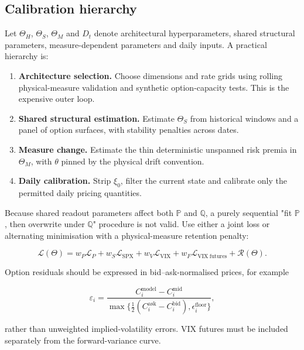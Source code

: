 \documentclass[11pt,a4paper]{article}
\newcommand{\Pp}{\mathbb{P}}
\newcommand{\Qq}{\mathbb{Q}}
\begin{document}
\subsection{Calibration hierarchy}

Let \(\Theta_H\), \(\Theta_S\), \(\Theta_M\) and \(D_t\) denote architectural
hyperparameters, shared structural parameters, measure-dependent parameters and daily inputs.
A practical hierarchy is:

\begin{enumerate}
  \item \textbf{Architecture selection.} Choose dimensions and rate grids using rolling
  physical-measure validation and synthetic option-capacity tests. This is the expensive outer
  loop.
  \item \textbf{Shared structural estimation.} Estimate \(\Theta_S\) from historical windows
  and a panel of option surfaces, with stability penalties across dates.
  \item \textbf{Measure change.} Estimate the thin deterministic unspanned risk premia in
  \(\Theta_M\), with \(\theta\) pinned by the physical drift convention.
  \item \textbf{Daily calibration.} Strip \(\xi_0\), filter the current state and calibrate only
  the permitted daily pricing quantities.
\end{enumerate}

Because shared readout parameters affect both \(\Pp\) and \(\Qq\), a purely sequential
"fit \(\Pp\), then overwrite under \(\Qq\)" procedure is not valid. Use either a joint loss
or alternating minimisation with a physical-measure retention penalty:

\begin{equation}
\mathcal L(\Theta)
=w_P\mathcal L_P
+w_S\mathcal L_{\mathrm{SPX}}
+w_V\mathcal L_{\mathrm{VIX}}
+w_F\mathcal L_{\mathrm{VIX\ futures}}
+\mathcal R(\Theta).
\label{eq:joint-loss}
\end{equation}

Option residuals should be expressed in bid--ask-normalised prices, for example

\begin{equation}
\varepsilon_i
=\frac{C_i^{\mathrm{model}}-C_i^{\mathrm{mid}}}
{\max\{\tfrac12(C_i^{\mathrm{ask}}-C_i^{\mathrm{bid}}),\epsilon_i^{\mathrm{floor}}\}},
\end{equation}

rather than unweighted implied-volatility errors. VIX futures must be included separately from
the forward-variance curve.
\end{document}
